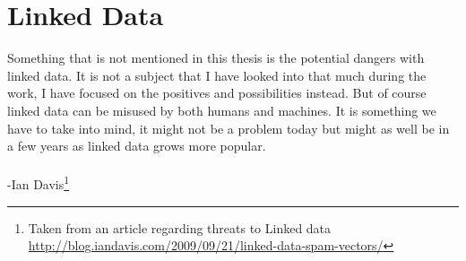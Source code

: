 \section{Linked Data}
Something that is not mentioned in this thesis is the potential dangers with linked data. It is not a subject that I have looked into that much during the work, I have focused on the positives and possibilities instead. But of course linked data can be misused by both humans and machines. It is something we have to take into mind, it might not be a problem today but might as well be in a few years as linked data grows more popular.\\\\
 -Ian Davis\footnote{Taken from an article regarding threats to Linked data \url{http://blog.iandavis.com/2009/09/21/linked-data-spam-vectors/}}
